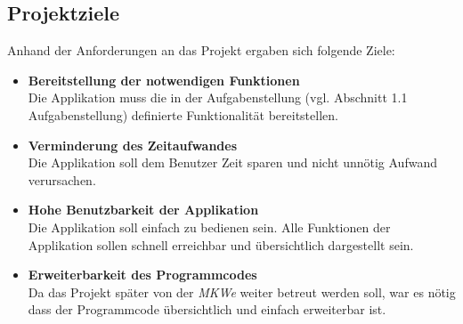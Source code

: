 \subsection{Projektziele}
Anhand der Anforderungen an das Projekt ergaben sich folgende Ziele:
\begin{itemize}
\item \textbf{Bereitstellung der notwendigen Funktionen} \\
Die Applikation muss die in der Aufgabenstellung (vgl. Abschnitt 1.1 Aufgabenstellung) definierte Funktionalität bereitstellen.
\item \textbf{Verminderung des Zeitaufwandes} \\
Die Applikation soll dem Benutzer Zeit sparen und nicht unnötig Aufwand verursachen.
\item \textbf{Hohe Benutzbarkeit der Applikation} \\
Die Applikation soll einfach zu bedienen sein. Alle Funktionen der Applikation sollen schnell erreichbar und übersichtlich dargestellt sein.
\item \textbf{Erweiterbarkeit des Programmcodes} \\
Da das Projekt später von der \textit{MKWe} weiter betreut werden soll, war es nötig dass der Programmcode übersichtlich und einfach erweiterbar ist.
\end{itemize}
